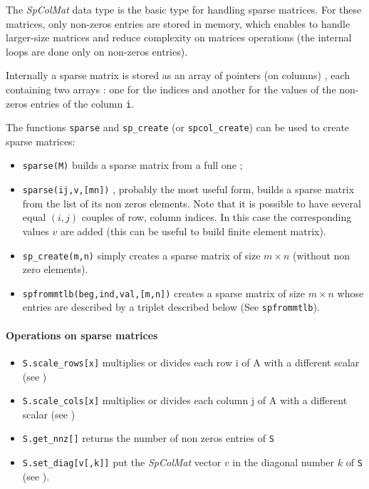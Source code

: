 \begin{mandescription}

The \emph{SpColMat} data type is the basic type for handling sparse matrices. 
For these matrices, only non-zeros entries are stored in memory, which enables to 
handle larger-size matrices and reduce complexity on matrices operations (the internal
loops are done only on non-zeros entries).

Internally a sparse matrix is stored as an array of pointers (on columns) , each containing 
two arrays : one for the indices and another for the values of the non-zeros entries of
the column \verb+i+. 
 
The functions \verb+sparse+ and \verb+sp_create+ (or  \verb+spcol_create+) can be used to create
sparse matrices:
\begin{itemize}
\item \verb+sparse(M)+ builds a sparse matrix from a full one ;
\item \verb+sparse(ij,v,[mn])+ , probably the most useful form, builds a sparse matrix
   from the list of its non zeros elements. Note that it is possible to have several equal
   $(i,j)$ couples of row, column indices. In this case the corresponding values $v$ are 
   added (this can be useful to build finite element matrix).
\item \verb+sp_create(m,n)+ simply creates a sparse matrix of size $m \times n$ (without
   non zero elements).   
\item \verb+spfrommtlb(beg,ind,val,[m,n])+  creates a sparse matrix of size $m \times n$ 
whose entries are described by a triplet described below (See \verb+spfrommtlb+).
\end{itemize}

\end{mandescription}

\paragraph{Operations on sparse matrices}
\begin{itemize}
\item \verb+S.scale_rows[x]+ multiplies or divides each row i of A with a different scalar (see ) 
\item \verb+S.scale_cols[x]+ multiplies or divides each column j of A with a different scalar (see )
\item \verb+S.get_nnz[]+ returns the number of non zeros entries of \verb+S+ 
\item \verb+S.set_diag[v[,k]]+ put the \emph{SpColMat} vector $v$ in the diagonal number $k$ of \verb+S+
 (see ).

\end{itemize}

